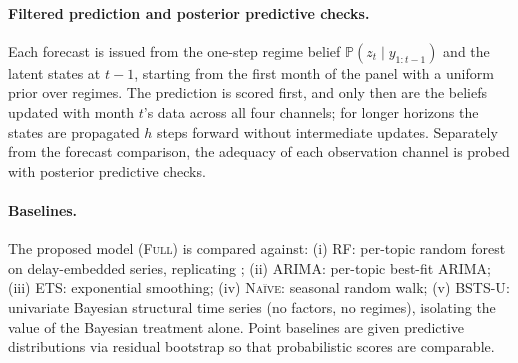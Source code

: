 \documentclass[review]{elsarticle}
\newcommand{\Prob}{\mathbb{P}}
\begin{document}
\begin{table}
\centering
\caption{Data sources and coverage.}
\label{tab:data}
\small
{}
\end{table}

\paragraph{Filtered prediction and posterior predictive checks.}
Each forecast is issued from the one-step regime belief $\Prob(z_t \mid y_{1:t-1})$ and the latent states at $t-1$, starting from the first month of the panel with a uniform prior over regimes. The prediction is scored first, and only then are the beliefs updated with month $t$'s data across all four channels; for longer horizons the states are propagated $h$ steps forward without intermediate updates. Separately from the forecast comparison, the adequacy of each observation channel is probed with posterior predictive checks.

\paragraph{Baselines.}
The proposed model (\textsc{Full}) is compared against:
(i) \textsc{RF}: per-topic random forest on delay-embedded series, replicating \citet{kia2024};
(ii) \textsc{ARIMA}: per-topic best-fit ARIMA;
(iii) \textsc{ETS}: exponential smoothing;
(iv) \textsc{Na\"ive}: seasonal random walk;
(v) \textsc{BSTS-U}: univariate Bayesian structural time series (no factors, no regimes), isolating the value of the Bayesian treatment alone.
Point baselines are given predictive distributions via residual bootstrap so that probabilistic scores are comparable.
\end{document}
